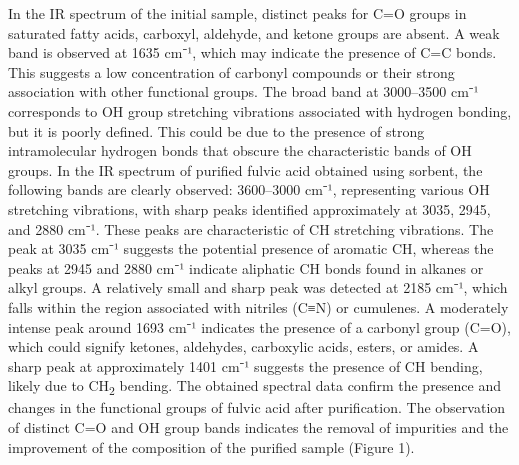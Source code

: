 \begin{multicols}{2}
In the IR spectrum of the initial sample, distinct peaks for C=O groups
in saturated fatty acids, carboxyl, aldehyde, and ketone groups are
absent. A weak band is observed at 1635 cm⁻¹, which may indicate the
presence of C=C bonds. This suggests a low concentration of carbonyl
compounds or their strong association with other functional groups. The
broad band at 3000--3500 cm⁻¹ corresponds to OH group stretching
vibrations associated with hydrogen bonding, but it is poorly defined.
This could be due to the presence of strong intramolecular hydrogen
bonds that obscure the characteristic bands of OH groups. In the IR
spectrum of purified fulvic acid obtained using sorbent, the following
bands are clearly observed: 3600--3000 cm⁻¹, representing various OH
stretching vibrations, with sharp peaks identified approximately at
3035, 2945, and 2880 cm⁻¹. These peaks are characteristic of CH
stretching vibrations. The peak at 3035 cm⁻¹ suggests the potential
presence of aromatic CH, whereas the peaks at 2945 and 2880 cm⁻¹
indicate aliphatic CH bonds found in alkanes or alkyl groups. A
relatively small and sharp peak was detected at 2185 cm⁻¹, which falls
within the region associated with nitriles (C≡N) or cumulenes. A
moderately intense peak around 1693 cm⁻¹ indicates the presence of a
carbonyl group (C=O), which could signify ketones, aldehydes, carboxylic
acids, esters, or amides. A sharp peak at approximately 1401 cm⁻¹
suggests the presence of CH bending, likely due to CH\textsubscript{2}
bending. The obtained spectral data confirm the presence and changes in
the functional groups of fulvic acid after purification. The observation
of distinct C=O and OH group bands indicates the removal of impurities
and the improvement of the composition of the purified sample (Figure
1).
\end{multicols}

% 
% 

